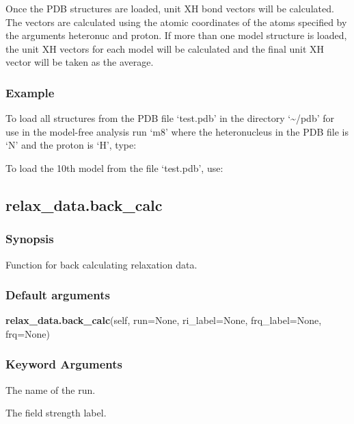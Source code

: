 Once the PDB structures are loaded, unit XH bond vectors will be calculated.  The vectors
are calculated using the atomic coordinates of the atoms specified by the arguments
heteronuc and proton.  If more than one model structure is loaded, the unit XH vectors for
each model will be calculated and the final unit XH vector will be taken as the average.


\subsubsection{Example}

To load all structures from the PDB file `test.pdb' in the directory `\~{}/pdb' for use in the
model-free analysis run `m8' where the heteronucleus in the PDB file is `N' and the proton
is `H', type:



To load the 10th model from the file `test.pdb', use:




\newpage

\subsection{relax\_data.back\_calc}


\subsubsection{Synopsis}

Function for back calculating relaxation data.

\subsubsection{Default arguments}

\textsf{\textbf{relax\_data.back\_calc}(self, run=None, ri\_label=None, frq\_label=None, frq=None)}


\subsubsection{Keyword Arguments}

  The name of the run.

  The field strength label.


\newpage


